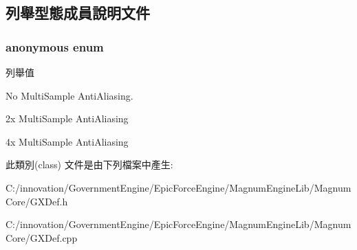 \subsection{列舉型態成員說明文件}
\subsubsection[{\texorpdfstring{anonymous enum}{anonymous enum}}]{\setlength{\rightskip}{0pt plus 5cm}anonymous enum}\hypertarget{class_i_dream_sky_1_1_g_x_multi_sample_mode_a12e8d84984467d5cc2e8eca00fcaf171}{}\label{class_i_dream_sky_1_1_g_x_multi_sample_mode_a12e8d84984467d5cc2e8eca00fcaf171}
\begin{Desc}
\item[列舉值]\par
\begin{description}
\item[{\em 
None\hypertarget{class_i_dream_sky_1_1_g_x_multi_sample_mode_a12e8d84984467d5cc2e8eca00fcaf171af350d6500945cabe59c13b6b01d34ee2}{}\label{class_i_dream_sky_1_1_g_x_multi_sample_mode_a12e8d84984467d5cc2e8eca00fcaf171af350d6500945cabe59c13b6b01d34ee2}
}]No Multi\+Sample Anti\+Aliasing. \item[{\em 
Msaa2x\hypertarget{class_i_dream_sky_1_1_g_x_multi_sample_mode_a12e8d84984467d5cc2e8eca00fcaf171a94dd4d7afbee003f013d563057a3b072}{}\label{class_i_dream_sky_1_1_g_x_multi_sample_mode_a12e8d84984467d5cc2e8eca00fcaf171a94dd4d7afbee003f013d563057a3b072}
}]2x Multi\+Sample Anti\+Aliasing \item[{\em 
Msaa4x\hypertarget{class_i_dream_sky_1_1_g_x_multi_sample_mode_a12e8d84984467d5cc2e8eca00fcaf171a9b1e7b6620cf2d61b104187473fc4322}{}\label{class_i_dream_sky_1_1_g_x_multi_sample_mode_a12e8d84984467d5cc2e8eca00fcaf171a9b1e7b6620cf2d61b104187473fc4322}
}]4x Multi\+Sample Anti\+Aliasing \end{description}
\end{Desc}


此類別(class) 文件是由下列檔案中產生\+:\begin{DoxyCompactItemize}
\item 
C\+:/innovation/\+Government\+Engine/\+Epic\+Force\+Engine/\+Magnum\+Engine\+Lib/\+Magnum\+Core/G\+X\+Def.\+h\item 
C\+:/innovation/\+Government\+Engine/\+Epic\+Force\+Engine/\+Magnum\+Engine\+Lib/\+Magnum\+Core/G\+X\+Def.\+cpp\end{DoxyCompactItemize}
